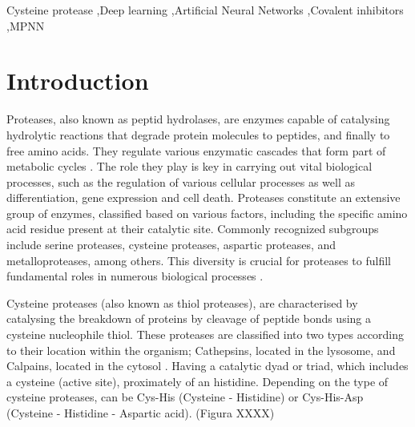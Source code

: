 \documentclass[final,times,twocolumn,article]{elsarticle}
\begin{document}
\begin{frontmatter}
\begin{abstract}
\end{abstract}



\begin{keyword}
Cysteine protease \sep Deep learning \sep Artificial Neural Networks \sep Covalent inhibitors \sep MPNN



\end{keyword}


\end{frontmatter}




\section{Introduction}

Proteases, also known as peptid hydrolases, are enzymes capable of catalysing hydrolytic reactions that degrade protein molecules to peptides, and finally to free amino acids. They regulate various enzymatic cascades that form part of metabolic cycles \cite{Ramos2019}. The role they play is key in carrying out vital biological processes, such as the regulation of various cellular processes as well as differentiation, gene expression and cell death. Proteases constitute an extensive group of enzymes, classified based on various factors, including the specific amino acid residue present at their catalytic site. Commonly recognized subgroups include serine proteases, cysteine proteases, aspartic proteases, and metalloproteases, among others. This diversity is crucial for proteases to fulfill fundamental roles in numerous biological processes \cite{Ramos2019}.

Cysteine proteases (also known as thiol proteases), are characterised by catalysing the breakdown of proteins by cleavage of peptide bonds using a cysteine nucleophile thiol. These proteases are classified into two types according to their location within the organism; Cathepsins, located in the lysosome, and Calpains, located in the cytosol \cite{Gupta2020}. Having a catalytic dyad or triad, which includes a cysteine (active site), proximately of an histidine. Depending on the type of cysteine proteases, can be Cys-His (Cysteine - Histidine) or Cys-His-Asp (Cysteine - Histidine - Aspartic acid)\cite{Nicholson2013}. (Figura XXXX) 
\end{document}
